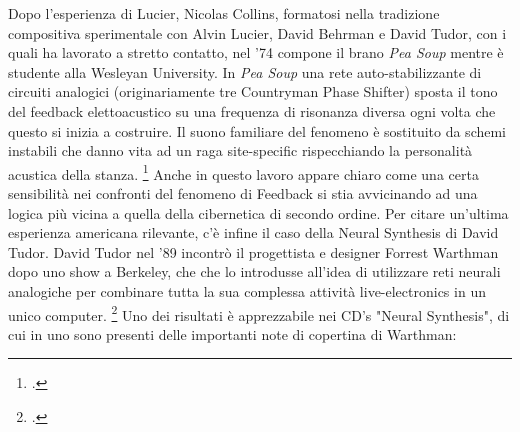 Dopo l'esperienza di Lucier, Nicolas Collins,
formatosi nella tradizione compositiva sperimentale con Alvin Lucier,
David Behrman e David Tudor, con i quali ha lavorato a stretto contatto,
nel '74 compone il brano \textit{Pea Soup} mentre è studente alla Wesleyan University.
In \textit{Pea Soup} una rete auto-stabilizzante di circuiti analogici
(originariamente tre Countryman Phase Shifter)
sposta il tono del feedback elettoacustico su una frequenza di risonanza
diversa ogni volta che questo si inizia a
costruire. Il suono familiare del fenomeno è sostituito da schemi instabili
che danno vita ad un raga site-specific
rispecchiando la personalità acustica della stanza. \footcite{collinspeasouphist}
Anche in questo lavoro appare chiaro come una certa sensibilità
nei confronti del fenomeno di Feedback si stia avvicinando ad una logica più vicina
a quella della cibernetica di secondo ordine.
Per citare un'ultima esperienza americana rilevante,
c'è infine il caso della Neural Synthesis di David Tudor.
David Tudor nel '89 incontrò il progettista e designer Forrest Warthman
dopo uno show a Berkeley,
che che lo introdusse all'idea di utilizzare reti neurali analogiche
per combinare tutta la sua complessa attività live-electronics in un unico computer.
\footcite{tudorneuralsynth}
Uno dei risultati è apprezzabile nei CD's "Neural Synthesis", 
di cui in uno sono presenti delle importanti note di copertina di Warthman:

